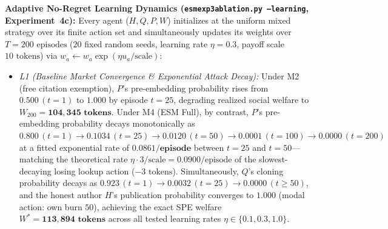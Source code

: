 \documentclass[runningheads,a4paper]{llncs}
\renewcommand{\_}{\textunderscore\allowbreak}
\begin{document}
\textbf{Adaptive No-Regret Learning Dynamics (\texttt{esm\_exp3\_ablation.py --learning}, Experiment~4c):} Every agent ($H,\allowbreak Q,\allowbreak P,\allowbreak W$) initializes at the uniform mixed strategy over its finite action set and simultaneously updates its weights over $T = 200\text{ episodes}$ ($20$ fixed random seeds, learning rate $\eta = 0.3$, payoff scale $10\text{ tokens}$) via $w_a \leftarrow w_a \exp(\eta u_a / \text{scale})$:
\begin{itemize}
  \item \emph{L1 (Baseline Market Convergence \& Exponential Attack Decay):} Under M2 (free citation exemption), $P$'s pre-embedding probability rises from $0.500\,(t=1)$ to $\mathbf{1.000}$ by episode $t = 25$, degrading realized social welfare to $W_{200} = \mathbf{104,345\text{ tokens}}$. Under M4 (ESM Full), by contrast, $P$'s pre-embedding probability decays monotonically as $0.800\,(t=1) \to 0.1034\,(t=25) \to 0.0120\,(t=50) \to 0.0001\,(t=100) \to \mathbf{0.0000}\,(t=200)$ at a fitted exponential rate of $\mathbf{0.0861\text{/episode}}$ between $t = 25$ and $t = 50$---matching the theoretical rate $\eta \cdot 3 / \text{scale} = 0.0900\text{/episode}$ of the slowest-decaying losing lookup action ($-3\text{ tokens}$). Simultaneously, $Q$'s cloning probability decays as $0.923\,(t=1) \to 0.0032\,(t=25) \to \mathbf{0.0000}\,(t \ge 50)$, and the honest author $H$'s publication probability converges to $\mathbf{1.000}$ (modal action: own burn $50$), achieving the exact SPE welfare $W^* = \mathbf{113,894\text{ tokens}}$ across all tested learning rates $\eta \in \{0.1,\allowbreak 0.3,\allowbreak 1.0\}$.

\end{itemize}
\end{document}

